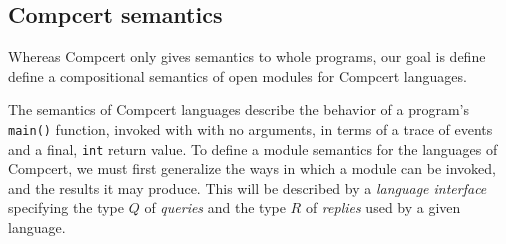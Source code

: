 \documentclass[11pt]{article}
\begin{document}
%
%
%

\subsection{Compcert semantics}

Whereas Compcert only gives semantics to whole programs,
our goal is define define a compositional semantics
of open modules for Compcert languages.

The semantics of Compcert languages describe
the behavior of a program's \texttt{main()} function,
invoked with with no arguments,
in terms of a trace of events and a final, \texttt{int} return value.
To define a module semantics for the languages of Compcert,
we must first generalize the ways in which a module can be invoked,
and the results it may produce.
This will be described by a \emph{language interface}
specifying the type $Q$ of \emph{queries} and the type $R$ of \emph{replies}
used by a given language.
\end{document}
